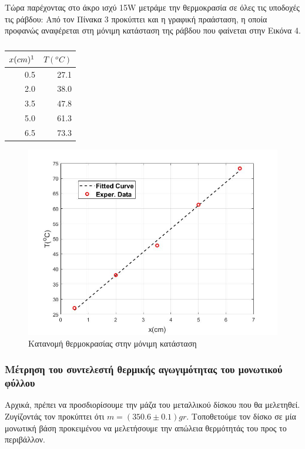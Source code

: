 \documentclass[a4paper]{article}
\begin{document}
Τώρα παρέχοντας στο άκρο ισχύ 15W μετράμε την θερμοκρασία σε όλες τις υποδοχές τις ράβδου: 
Από τον Πίνακα 3 προκύπτει και η γραφική πραάσταση, η οποία προφανώς αναφέρεται στη μόνιμη κατάσταση της ράβδου που φαίνεται στην Εικόνα 4.


\begin{table}[h!]
\centering
\caption{ }
\begin{tabular}{r|r}
$x(cm)\footnotemark$ & $T(^oC)$ \\
\hline\hline
0.5&27.1\\
2.0&38.0\\
3.5&47.8\\
5.0&61.3\\
6.5&73.3
\end{tabular}
\end{table}


\begin{figure}[h!]
\centering
\caption{ Κατανομή θερμοκρασίας στην μόνιμη κατάσταση}
\includegraphics[scale=0.53]{Tdistr.jpg}
\end{figure}


\subsubsection*{Μέτρηση του συντελεστή θερμικής αγωγιμότητας του μονωτικού φύλλου}

Αρχικά, πρέπει να προσδιορίσουμε την μάζα του μεταλλικού δίσκου που θα μελετηθεί. Ζυγίζοντάς τον προκύπτει ότι $m=(350.6\pm0.1)gr$. Τοποθετούμε τον δίσκο σε μία μονωτική βάση προκειμένου να μελετήσουμε την απώλεια θερμότητάς του προς το περιβάλλον. 
\end{document}
